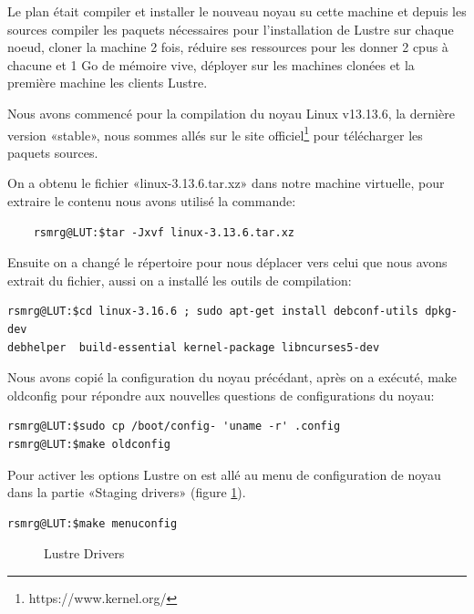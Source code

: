 \documentclass[12pt]{article}
\begin{document}
Le plan était compiler et installer le nouveau noyau su cette machine et depuis les sources compiler les paquets nécessaires pour l'installation de Lustre sur chaque noeud, cloner la machine 2 fois, réduire ses ressources pour les donner 2 cpus à chacune et 1 Go de mémoire vive, déployer sur les machines clonées et la première machine les clients Lustre.

Nous avons commencé pour la compilation du noyau Linux v13.13.6, la dernière version «stable», nous sommes allés sur le site officiel\footnote{https://www.kernel.org/} pour télécharger les paquets sources.

On a obtenu le fichier «linux-3.13.6.tar.xz» dans notre machine virtuelle, pour extraire le contenu nous avons utilisé la commande:

\begin{verbatim}
	rsmrg@LUT:$tar -Jxvf linux-3.13.6.tar.xz
\end{verbatim}

Ensuite on a changé le répertoire pour nous déplacer vers celui que nous avons extrait du fichier, aussi on a installé les outils de compilation:

\begin{verbatim}
rsmrg@LUT:$cd linux-3.16.6 ; sudo apt-get install debconf-utils dpkg-dev
debhelper  build-essential kernel-package libncurses5-dev
\end{verbatim}

Nous avons copié la configuration du noyau précédant, après on a exécuté, make oldconfig pour répondre aux nouvelles questions de configurations du noyau:

\begin{verbatim}
rsmrg@LUT:$sudo cp /boot/config- 'uname -r' .config
rsmrg@LUT:$make oldconfig
\end{verbatim}

Pour activer les options Lustre on est allé au menu de configuration de noyau dans la partie «Staging drivers» (figure \ref{kernel}).

\begin{verbatim}
rsmrg@LUT:$make menuconfig
\end{verbatim}

\begin{figure}[Lustre Options]
\caption{Lustre Drivers}
\label{kernel}
\end{figure}
\end{document}
